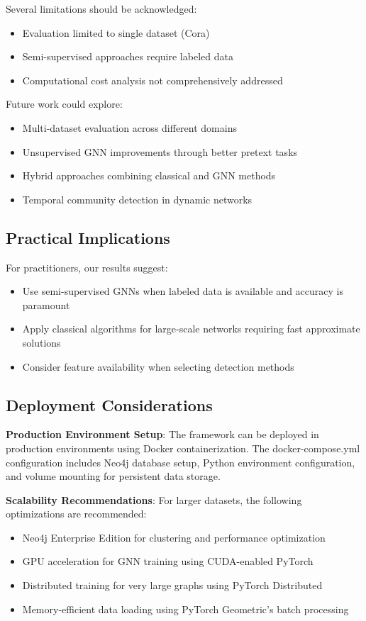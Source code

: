 \documentclass[conference]{IEEEtran}
\begin{document}
Several limitations should be acknowledged:
\begin{itemize}
    \item Evaluation limited to single dataset (Cora)
    \item Semi-supervised approaches require labeled data
    \item Computational cost analysis not comprehensively addressed
\end{itemize}

Future work could explore:
\begin{itemize}
    \item Multi-dataset evaluation across different domains
    \item Unsupervised GNN improvements through better pretext tasks
    \item Hybrid approaches combining classical and GNN methods
    \item Temporal community detection in dynamic networks
\end{itemize}

\subsection{Practical Implications}

For practitioners, our results suggest:
\begin{itemize}
    \item Use semi-supervised GNNs when labeled data is available and accuracy is paramount
    \item Apply classical algorithms for large-scale networks requiring fast approximate solutions
    \item Consider feature availability when selecting detection methods
\end{itemize}

\subsection{Deployment Considerations}

\textbf{Production Environment Setup}: The framework can be deployed in production environments using Docker containerization. The docker-compose.yml configuration includes Neo4j database setup, Python environment configuration, and volume mounting for persistent data storage.

\textbf{Scalability Recommendations}: For larger datasets, the following optimizations are recommended:
\begin{itemize}
    \item Neo4j Enterprise Edition for clustering and performance optimization
    \item GPU acceleration for GNN training using CUDA-enabled PyTorch
    \item Distributed training for very large graphs using PyTorch Distributed
    \item Memory-efficient data loading using PyTorch Geometric's batch processing
\end{itemize}
\end{document}
